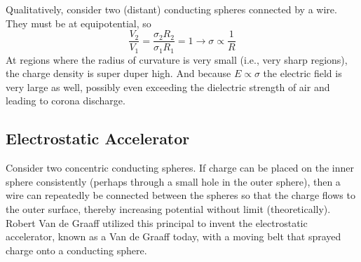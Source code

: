\documentclass[../PhysicsFormulae.tex]{subfiles}
\begin{document}
Qualitatively, consider two (distant) conducting spheres connected by a wire. They must be at equipotential, so
\[ \frac{V_2}{V_1} = \frac{\sigma_2 R_2}{\sigma_1 R_1} = 1 \rightarrow \sigma \propto \frac{1}{R} \]
At regions where the radius of curvature is very small (i.e., very sharp regions), the charge density is super duper high. And because $E \propto \sigma$ the electric field is very large as well, possibly even exceeding the dielectric strength of air and leading to corona discharge. 

\subsection{Electrostatic Accelerator}
Consider two concentric conducting spheres. If charge can be placed on the inner sphere consistently (perhaps through a small hole in the outer sphere), then a wire can repeatedly be connected between the spheres so that the charge flows to the outer surface, thereby increasing potential without limit (theoretically). Robert Van de Graaff utilized this principal to invent the electrostatic accelerator, known as a Van de Graaff today, with a moving belt that sprayed charge onto a conducting sphere. 
\end{document}
